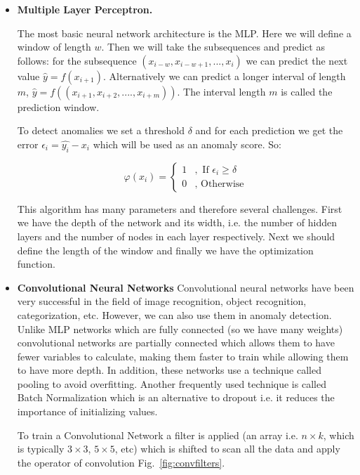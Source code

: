\documentclass[a4paper,12pt]{report}
\theoremstyle{definitionNODot}
\begin{document}
	\begin{itemize}
		\item \textbf{Multiple Layer Perceptron.}
		
		The most basic neural network architecture is the MLP. Here we will define a window of length $w$. Then we will take the subsequences and predict as follows: for the subsequence $(x_{i-w}, x_{i-w+1}, ... , x_{i})$ we can predict the next value $\hat{y} = f(x_{i+1}) $. Alternatively we can predict a longer interval of length $m$, $\hat{y} = f((x_{i+1}, x_{i+2},....,x_{i+m}))$. The interval length $m$ is called the prediction window.
		
		To detect anomalies we set a threshold $\delta$ and for each prediction we get the error $\epsilon_i = \hat{y_i} - x_i $ which will be used as an anomaly score. So:
		
		\begin{equation*}
			\varphi(x_i) = \begin{cases}
				1 &,\text{ If } \epsilon_i\geq\delta\\
				0 &, \text{ Otherwise}
			\end{cases}
		\end{equation*}
		
		This algorithm has many parameters and therefore several challenges. First we have the depth of the network and its width, i.e. the number of hidden layers and the number of nodes in each layer respectively. Next we should define the length of the window and finally we have the optimization function.
		
		\item \textbf{Convolutional Neural Networks}
		Convolutional neural networks have been very successful in the field of image recognition, object recognition, categorization, etc. However, we can also use them in anomaly detection. Unlike MLP networks which are fully connected (so we have many weights) convolutional networks are partially connected which allows them to have fewer variables to calculate, making them faster to train while allowing them to have more depth. In addition, these networks use a technique called pooling to avoid overfitting. Another frequently used technique is called Batch Normalization \cite{SergeyChristian2015BatchNormalization} which is an alternative to dropout i.e. it reduces the importance of initializing values. 
		
		To train a Convolutional Network a filter is applied (an array i.e. $n\times k$, which is typically $3\times 3$, $5\times 5$, etc) which is shifted to scan all the data and apply the operator of convolution Fig.~\ref{fig:convfilters}.
		

\end{itemize}
\end{document}
